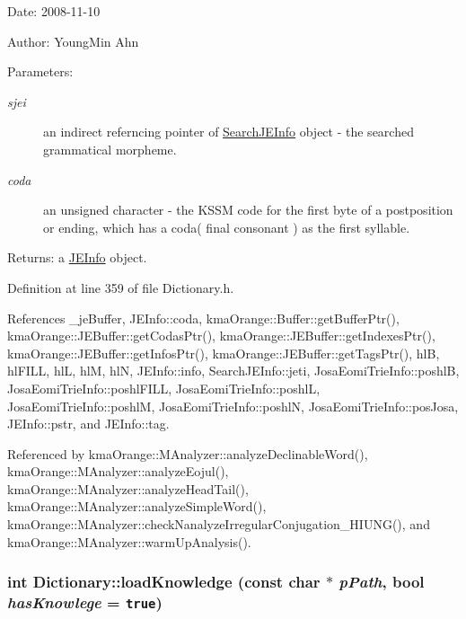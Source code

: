 \begin{Desc}
\item[Date:]2008-11-10 \end{Desc}
\begin{Desc}
\item[Author:]YoungMin Ahn \end{Desc}
\begin{Desc}
\item[Parameters:]
\begin{description}
\item[{\em sjei}]an indirect referncing pointer of \hyperlink{classSearchJEInfo}{SearchJEInfo} object - the searched grammatical morpheme. \item[{\em coda}]an unsigned character - the KSSM code for the first byte of a postposition or ending, which has a coda( final consonant ) as the first syllable. \end{description}
\end{Desc}
\begin{Desc}
\item[Returns:]a \hyperlink{classJEInfo}{JEInfo} object. \end{Desc}


Definition at line 359 of file Dictionary.h.

References \_\-jeBuffer, JEInfo::coda, kmaOrange::Buffer::getBufferPtr(), kmaOrange::JEBuffer::getCodasPtr(), kmaOrange::JEBuffer::getIndexesPtr(), kmaOrange::JEBuffer::getInfosPtr(), kmaOrange::JEBuffer::getTagsPtr(), hlB, hlFILL, hlL, hlM, hlN, JEInfo::info, SearchJEInfo::jeti, JosaEomiTrieInfo::poshlB, JosaEomiTrieInfo::poshlFILL, JosaEomiTrieInfo::poshlL, JosaEomiTrieInfo::poshlM, JosaEomiTrieInfo::poshlN, JosaEomiTrieInfo::posJosa, JEInfo::pstr, and JEInfo::tag.

Referenced by kmaOrange::MAnalyzer::analyzeDeclinableWord(), kmaOrange::MAnalyzer::analyzeEojul(), kmaOrange::MAnalyzer::analyzeHeadTail(), kmaOrange::MAnalyzer::analyzeSimpleWord(), kmaOrange::MAnalyzer::checkNanalyzeIrregularConjugation\_\-HIUNG(), and kmaOrange::MAnalyzer::warmUpAnalysis().\hypertarget{classkmaOrange_1_1Dictionary_22a1dd6af0f8698ff758de165ba5b613}{
\subsubsection[{loadKnowledge}]{\setlength{\rightskip}{0pt plus 5cm}int Dictionary::loadKnowledge (const char $\ast$ {\em pPath}, \/  bool {\em hasKnowlege} = {\tt true})}}
\label{classkmaOrange_1_1Dictionary_22a1dd6af0f8698ff758de165ba5b613}


